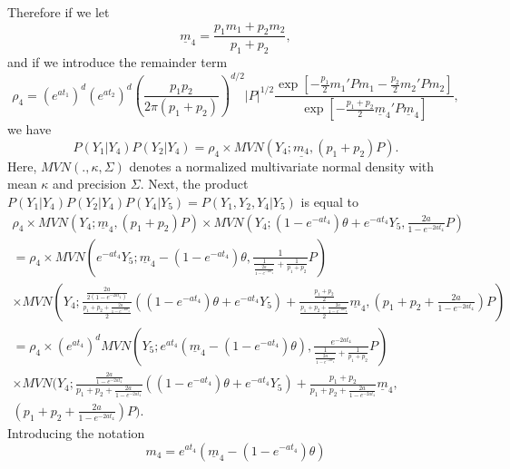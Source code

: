 \documentclass[12pt]{article}
\begin{document}
Therefore if we let
\begin{equation}
\underline{m}_4 = \frac{p_1 m_1 + p_2 m_2}{p_1 + p_2},
\end{equation}
and if we introduce the remainder term
\begin{equation}
\rho_4 =  (e^{at_1})^d (e^{at_2})^d  \left( \frac{p_1 p_2}{2 \pi (p_1 + p_2)} \right)^{d/2}  |P|^{1/2} \frac {\exp \left[ -\frac{p_1}{2} m_1' P m_1 -\frac{p_2}{2}m_2'P m_2  \right] }
{ \exp \left[ -\frac{p_1 + p_2}{2} \underline{m}_4' P \underline{m}_4 \right] } ,
\end{equation}
we have
\begin{equation}
P(Y_1 | Y_4) P(Y_2 | Y_4 ) = \rho_4 \times MVN(Y_4 ; \underline{m_4} , (p_1 + p_2)P).
\end{equation}
Here, $MVN(., \kappa, \Sigma)$ denotes a normalized multivariate normal density with mean $\kappa$ and
precision $\Sigma$.
Next, the product $P(Y_1 | Y_4) P(Y_2 | Y_4 ) P(Y_4 | Y_5) = P(Y_1, Y_2, Y_4 | Y_5)$ is equal to
\begin{eqnarray}
\rho_4 \times MVN (Y_4 ; \underline{m}_4 , (p_1 + p_2)P) 
\times MVN \left( Y_4; (1 - e^{-at_4}) \theta + e^{-at_4} Y_5  , \frac{2a}{1-e^{-2at_4}} P \right) \\
 =  \rho_4 \times MVN \left( e^{-at_4} Y_5 ; \underline{m}_4 - (1 - e^{-at_4}) \theta  , \frac{1}{ \frac{1}{ \frac{2a}{1-e^{-2at_4}}  } + \frac{1}{p_1 + p_2} } P  \right)  \\
 \times  MVN \left( Y_4 ; \frac{ \frac{2a}{2(1-e^{-2at_4})} }{\frac{p_1+p_2 + \frac{2a}{1-e^{-2at_4}}  }{2}}( (1 - e^{-at_4}) \theta + e^{-at_4} Y_5 ) + 
\frac{  \frac{p_1 +p_2}{2}}{\frac{p_1+p_2 + \frac{2a}{1-e^{-2at_4}}  }{2}} \underline{m}_4, 
 \left( p_1 + p_2 + \frac{2a}{1-e^{-2at_4}} \right) P  \right) \\
 =  \rho_4 \times \left( e^{at_4} \right)^d MVN \left(Y_5 ; e^{at_4} (\underline{m}_4 - (1 - e^{-at_4}) \theta )  , \frac{e^{-2at_4}}{  \frac{1}{\frac{2a}{1-e^{-2at_4}}}  + \frac{1}{p_1 + p_2} } P  \right)  \\
\times MVN ( Y_4 ; \frac{ \frac{2a}{1-e^{-2at_4}}  }{p_1+p_2 + \frac{2a}{1-e^{-2at_4}}  }( (1 - e^{-at_4}) \theta + e^{-at_4} Y_5 ) + 
\frac{  p_1 +p_2}{ p_1+p_2 + \frac{2a}{1-e^{-2at_4}}  } \underline{m}_4, \\
 \left( p_1 + p_2 + \frac{2a}{1-e^{-2at_4}} \right) P ) .
\end{eqnarray}
Introducing the notation 
\begin{equation}
m_4 = e^{at_4} ( \underline{m}_4 - (1 - e^{-at_4}) \theta )  
\end{equation}
\end{document}
